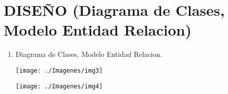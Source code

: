 \section{ DISEÑO (Diagrama de Clases, Modelo Entidad Relacion)} 

\begin{enumerate}[1.]
	\item Diagrama de Clases, Modelo Entidad Relacion.
    


	\begin{center}
	\texttt{[image: ./Imagenes/img3]} 
	\end{center}
	
	\begin{center}
	\texttt{[image: ./Imagenes/img4]} 
	\end{center}
	
\end{enumerate} 
